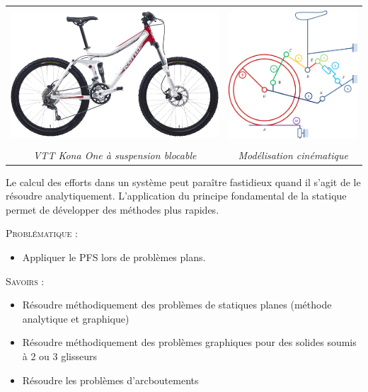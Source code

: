 \documentclass[10pt]{article}
\begin{document}



\begin{center}
\begin{tabular}{cc}
\includegraphics[height=5cm]{images/vtt1} &
\includegraphics[height=5cm]{images/vtt2} \\
\textit{VTT Kona One à suspension blocable \cite{vtt}} & \textit{Modélisation cinématique}\\
\end{tabular}
\end{center}

\vspace{.2cm}
Le calcul des efforts dans un système peut paraître fastidieux quand il s'agit de le résoudre analytiquement. L'application du principe fondamental de la statique permet de développer des méthodes plus rapides. 

\begin{prob}
\textsc{Problématique :}
\begin{itemize}
\item Appliquer le PFS lors de problèmes plans.
\end{itemize}
\end{prob}

\begin{savoir}
\textsc{Savoirs :}
\begin{itemize}
\item Résoudre méthodiquement des problèmes de statiques planes (méthode analytique et graphique)
\item Résoudre méthodiquement des problèmes graphiques pour des solides soumis à 2 ou 3 glisseurs
\item Résoudre les problèmes d'arcboutements
\end{itemize}
\end{savoir}
\end{document}
